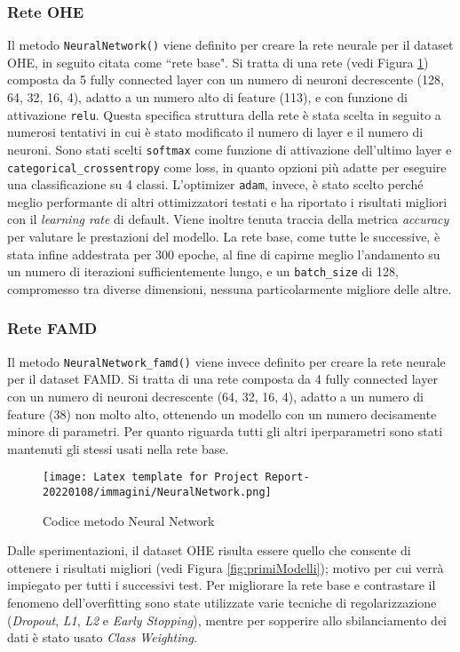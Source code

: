 \subsubsection{Rete OHE}
Il metodo \texttt{NeuralNetwork()} viene definito per creare la rete neurale per il dataset OHE, in seguito citata come ``rete base". 
Si tratta di una rete (vedi Figura \ref{fig:neuralNetwork}) composta da 5 fully connected layer con un numero di neuroni decrescente (128, 64, 32, 16, 4), adatto a un numero alto di feature (113), e con funzione di attivazione \texttt{relu}. Questa specifica struttura della rete è stata scelta in seguito a numerosi tentativi in cui è stato modificato il numero di layer e il numero di neuroni.
Sono stati scelti \texttt{softmax} come funzione di attivazione dell'ultimo layer e \texttt{categorical\_crossentropy} come loss, in quanto opzioni più adatte per eseguire una classificazione su 4 classi. 
L'optimizer \texttt{adam}, invece, è stato scelto perché meglio performante di altri ottimizzatori testati e ha riportato i risultati migliori con il \textit{learning rate} di default. 
Viene inoltre tenuta traccia della metrica \textit{accuracy} per valutare le prestazioni del modello.
La rete base, come tutte le successive, è stata infine addestrata per 300 epoche, al fine di capirne meglio l'andamento su un numero di iterazioni sufficientemente lungo, e un \texttt{batch\_size} di 128, compromesso tra diverse dimensioni, nessuna particolarmente migliore delle altre.

\subsubsection{Rete FAMD}

Il metodo \texttt{NeuralNetwork\_famd()} viene invece definito per creare la rete neurale per il dataset FAMD. Si tratta di una rete composta da 4 fully connected layer con un numero di neuroni decrescente (64, 32, 16, 4), adatto a un numero di feature (38) non molto alto, ottenendo un modello con un numero decisamente minore di parametri. 
Per quanto riguarda tutti gli altri iperparametri sono stati mantenuti gli stessi usati nella rete base.
\begin{figure}[H]
     \centering
     \texttt{[image: Latex template for Project Report-20220108/immagini/NeuralNetwork.png]}
     \caption{Codice metodo Neural Network}
     \label{fig:neuralNetwork}
\end{figure}
Dalle sperimentazioni, il dataset OHE risulta essere quello che
consente di ottenere i risultati migliori (vedi Figura \ref{fig:primiModelli}); motivo per cui verrà impiegato per tutti i successivi test. 
Per migliorare la rete base e contrastare il fenomeno dell'overfitting sono state utilizzate varie tecniche di regolarizzazione (\textit{Dropout}, \textit{L1}, \textit{L2} e \textit{Early Stopping}), mentre per sopperire allo sbilanciamento dei dati è stato usato \textit{Class Weighting}.




